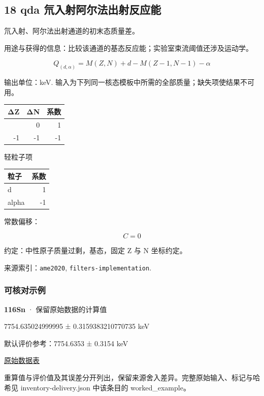 \documentclass[
  11pt,
  letterpaper,
]{article}
\begin{document}
\subsection{18 qda
氘入射阿尔法出射反应能}\label{qda-ux6c18ux5165ux5c04ux963fux5c14ux6cd5ux51faux5c04ux53cdux5e94ux80fd}

氘入射、阿尔法出射通道的初末态质量差。

用途与获得的信息：比较该通道的基态反应能；实验室束流阈值还涉及运动学。

\[
Q_{(d,\alpha)}=M(Z,N)+d-M(Z-1,N-1)-\alpha
\]

输出单位：keV.
输入为下列同一核态模板中所需的全部质量；缺失项使结果不可用。

\begin{longtable}[]{@{}rrr@{}}
\toprule\noalign{}
ΔZ & ΔN & 系数 \\
\midrule\noalign{}
\endhead
\bottomrule\noalign{}
\endlastfoot
0 & 0 & 1 \\
-1 & -1 & -1 \\
\end{longtable}

轻粒子项

\begin{longtable}[]{@{}lr@{}}
\toprule\noalign{}
粒子 & 系数 \\
\midrule\noalign{}
\endhead
\bottomrule\noalign{}
\endlastfoot
d & 1 \\
alpha & -1 \\
\end{longtable}

常数偏移：

\[
C=0
\]

约定：中性原子质量过剩，基态，固定 Z 与 N 坐标约定。

来源索引：\texttt{ame2020}, \texttt{filters-implementation}.

\subsubsection{可核对示例}\label{ux53efux6838ux5bf9ux793aux4f8b-17}

\textbf{116Sn} · 保留原始数据的计算值

7754.635024999995 ± 0.3159383210770735 keV

默认评价参考：7754.6353 ± 0.3154 keV

\href{https://www-nds.iaea.org/amdc/ame2020/rct2_1.mas20.txt}{原始数据表}

重算值与评价值及其误差分开列出，保留来源舍入差异。完整原始输入、标记与哈希见
inventory-delivery.json 中该条目的 worked\_example。
\end{document}
